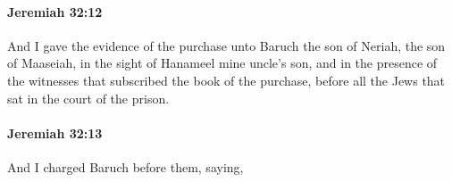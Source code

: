 		\paragraph{Jeremiah 32:12} %
			\label{JEREMIAH-32-12}

			And I gave the evidence of the purchase unto Baruch the son of Neriah, the son of Maaseiah, in the sight of Hanameel mine uncle’s son, and in the presence of the witnesses that subscribed the book of the purchase, before all the Jews that sat in the court of the prison.


		\paragraph{Jeremiah 32:13} %
			\label{JEREMIAH-32-13}

			And I charged Baruch before them, saying,


